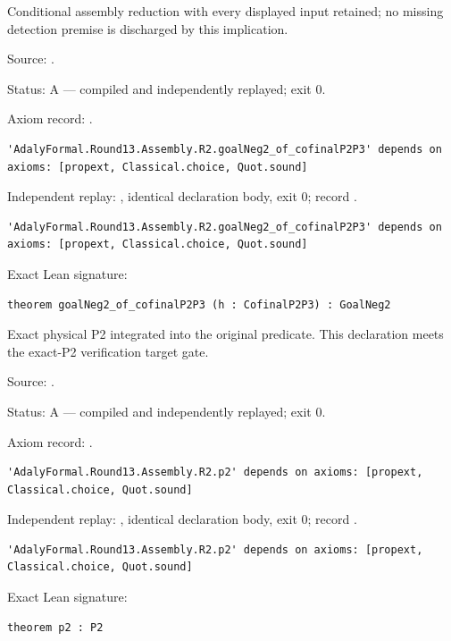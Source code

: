 \begin{theorem}[bp-574]
\label{bp-574}
\leanok
Conditional assembly reduction with every displayed input retained; no missing detection premise is discharged by this implication.

\par Source: \texttt{}.
\par Status: A — compiled and independently replayed; exit 0.
\par Axiom record: \texttt{}.
\begin{verbatim}
'AdalyFormal.Round13.Assembly.R2.goalNeg2_of_cofinalP2P3' depends on axioms: [propext, Classical.choice, Quot.sound]
\end{verbatim}
\par Independent replay: \texttt{}, identical declaration body, exit 0; record \texttt{}.
\begin{verbatim}
'AdalyFormal.Round13.Assembly.R2.goalNeg2_of_cofinalP2P3' depends on axioms: [propext, Classical.choice, Quot.sound]
\end{verbatim}
\par Exact Lean signature:
\begin{verbatim}
theorem goalNeg2_of_cofinalP2P3 (h : CofinalP2P3) : GoalNeg2
\end{verbatim}
\end{theorem}

\begin{theorem}[bp-575]
\label{bp-575}
\leanok
Exact physical P2 integrated into the original predicate. This declaration meets the exact-P2 verification target gate.

\par Source: \texttt{}.
\par Status: A — compiled and independently replayed; exit 0.
\par Axiom record: \texttt{}.
\begin{verbatim}
'AdalyFormal.Round13.Assembly.R2.p2' depends on axioms: [propext, Classical.choice, Quot.sound]
\end{verbatim}
\par Independent replay: \texttt{}, identical declaration body, exit 0; record \texttt{}.
\begin{verbatim}
'AdalyFormal.Round13.Assembly.R2.p2' depends on axioms: [propext, Classical.choice, Quot.sound]
\end{verbatim}
\par Exact Lean signature:
\begin{verbatim}
theorem p2 : P2
\end{verbatim}
\end{theorem}

